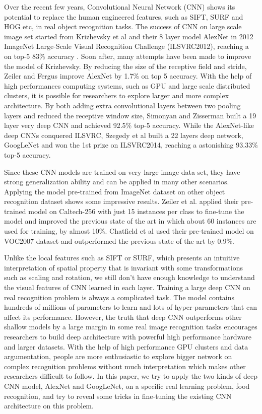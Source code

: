﻿Over the recent few years, Convolutional Neural Network (CNN) shows its potential to replace the human engineered features, such as SIFT\cite{lowe1999object}, SURF\cite{bay2006surf} and HOG\cite{dalal2005histograms} etc, in real object recognition tasks.  The success of CNN on large scale image set started from Krizhevsky et al\cite{krizhevsky2012imagenet} and their 8 layer model AlexNet in 2012 ImageNet Large-Scale Visual Recognition Challenge (ILSVRC2012), reaching a on top-5 83\% accuracy . Soon after, many attempts have been made to improve the model of Krizhevsky.
By reducing the size of the receptive field and stride, Zeiler and Fergus improve AlexNet by 1.7\% on top 5 accuracy\cite{zeiler2014visualizing}. With the help of high performances computing systems, such as GPU and large scale distributed clusters, it is possible for researchers to explore larger and more complex architecture. By both adding extra convolutional layers between two pooling layers and reduced the receptive window size, Simonyan and Zisserman built a 19 layer very deep CNN and achieved 92.5\% top-5 accuracy\cite{simonyan2014very}. While the AlexNet-like deep CNNs conquered ILSVRC, Szegedy et al built a 22 layers deep network, GoogLeNet \cite{szegedy2014going} and won the 1st prize on ILSVRC2014, reaching a astonishing 93.33\% top-5 accuracy.

Since these CNN models are trained on very large image data set, they have strong generalization ability and can be applied in many other scenarios. Applying the model pre-trained from ImageNet dataset on other object recognition dataset shows some impressive results.
Zeiler et al. applied their pre-trained model on Caltech-256 with just 15 instances per class to fine-tune the model and improved the previous state of the art in which about 60 instances are used for training, by almost 10\%\cite{zeiler2014visualizing}.
Chatfield et al used their pre-trained model on VOC2007 dataset and outperformed the previous state of the art by 0.9\%\cite{Chatfield14}.

Unlike the local features such as SIFT or SURF, which presents an intuitive interpretation of spatial property that is invariant with some transformations such as scaling and rotation, we still don't have enough knowledge to understand the visual features of CNN learned in each layer. Training a large deep CNN on real recognition problem is always a complicated task. The model contains hundreds of millions of parameters to learn and lots of hyper-parameters that can affect its performance. However, the truth that deep CNN outperforms other shallow models by a large margin in some real image recognition tasks encourages researchers to build deep architecture with powerful high performance hardware and larger datasets. With the help of high performance GPU clusters and data argumentation, people are more enthusiastic to explore bigger network on complex recognition problems without much interpretation which makes other researchers difficult to follow. In this paper, we try to apply the two kinds of deep CNN model, AlexNet and GoogLeNet, on a specific real learning problem, food recognition, and try to reveal some tricks in fine-tuning the existing CNN architecture on this problem.

